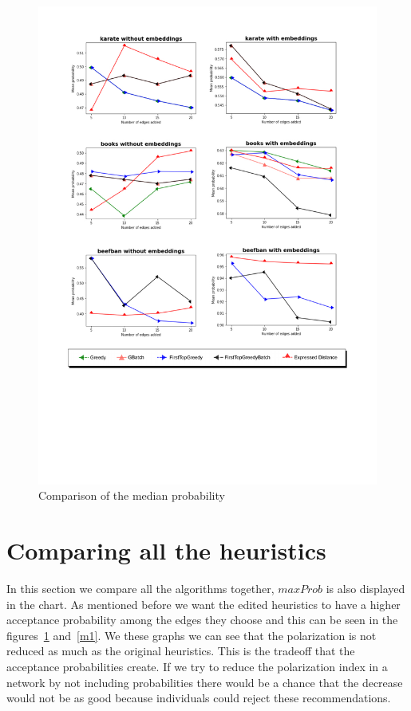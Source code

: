 \begin{figure}[!htbp]
	\begin{center}
	\advance\leftskip-1.3cm
	\captionsetup{justification=centering,margin=2cm}
	\includegraphics[width=1\textwidth]{Figures/m1}
	\caption{Comparison of the median probability}
	\label{m2}
	\end{center}
\end{figure}
\clearpage

\section{Comparing all the heuristics}		
\label{sec:all}

In this section we compare all the algorithms together, $maxProb$ is also displayed in the chart. As mentioned before we want the edited heuristics to have a higher acceptance probability among the edges they choose and this can be seen in the figures~\ref{m2} and~\ref{m1}. We these graphs we can see that the polarization is not reduced as much as the original heuristics. This is the tradeoff that the acceptance probabilities create. If we try to reduce the polarization index in a network by not including probabilities there would be a chance that the decrease would not be as good because individuals could reject these recommendations.
 
